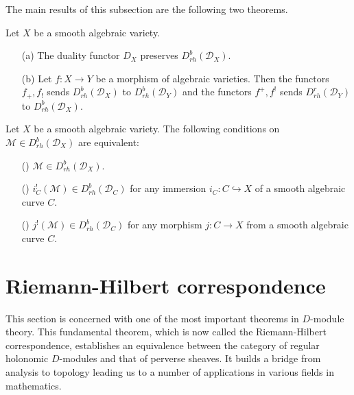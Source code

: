 The main results of this subsection are the following two theorems.

\begin{theorem}\label{D-module holonomic regular functorial prop}
Let $X$ be a smooth algebraic variety.
\begin{enumerate}
    \item[(a)] The duality functor $D_X$ preserves $D^b_{rh}(\mathscr{D}_X)$.
    \item[(b)] Let $f:X\to Y$ be a morphism of algebraic varieties. Then the functors $f_+,f_!$ sends $D^b_{rh}(\mathscr{D}_X)$ to $D^b_{rh}(\mathscr{D}_Y)$ and the functors $f^+,f^!$ sends $D^r_{rh}(\mathscr{D}_Y)$ to $D^b_{rh}(\mathscr{D}_X)$. 
\end{enumerate}
\end{theorem}

\begin{theorem}\label{D-module holonomic regular curve testing}
Let $X$ be a smooth algebraic variety. The following conditions on $\mathscr{M}\in D^b_{rh}(\mathscr{D}_X)$ are equivalent:
\begin{enumerate}
    \item[(\rmnum{1})] $\mathscr{M}\in D^b_{rh}(\mathscr{D}_X)$.
    \item[(\rmnum{2})] $i_C^!(\mathscr{M})\in D^b_{rh}(\mathscr{D}_C)$ for any immersion $i_C:C\hookrightarrow X$ of a smooth algebraic curve $C$.
    \item[(\rmnum{3})] $j^!(\mathscr{M})\in D^b_{rh}(\mathscr{D}_C)$ for any morphism $j:C\to X$ from a smooth algebraic curve $C$.
\end{enumerate}
\end{theorem}

\section{Riemann-Hilbert correspondence}
This section is concerned with one of the most important theorems in $D$-module theory. This fundamental theorem, which is now called the Riemann-Hilbert correspondence, establishes an equivalence between the category of regular holonomic $D$-modules and that of perverse sheaves. It builds a bridge from analysis to topology leading us to a number of applications in various fields in mathematics.

